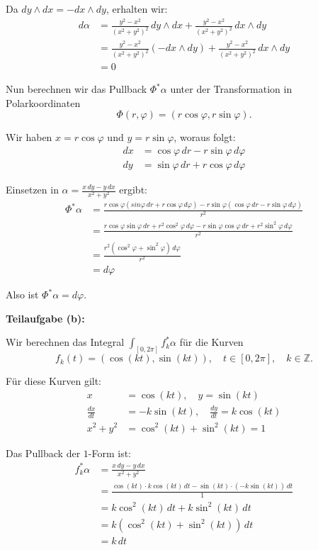 \documentclass{article}
\newcommand{\Z}{\mathbb{Z}}
\begin{document}
Da $dy \wedge dx = -dx \wedge dy$, erhalten wir:
\begin{align}
d\alpha &= \frac{y^2-x^2}{(x^2+y^2)^2}\,dy \wedge dx + \frac{y^2-x^2}{(x^2+y^2)^2}\,dx \wedge dy \\
&= \frac{y^2-x^2}{(x^2+y^2)^2}(-dx \wedge dy) + \frac{y^2-x^2}{(x^2+y^2)^2}\,dx \wedge dy \\
&= 0
\end{align}

Nun berechnen wir das Pullback $\Phi^*\alpha$ unter der Transformation in Polarkoordinaten
$$\Phi(r,\varphi) = (r\cos\varphi, r\sin\varphi).$$

Wir haben $x = r\cos\varphi$ und $y = r\sin\varphi$, woraus folgt:
\begin{align}
dx &= \cos\varphi\,dr - r\sin\varphi\,d\varphi \\
dy &= \sin\varphi\,dr + r\cos\varphi\,d\varphi
\end{align}

Einsetzen in $\alpha = \frac{x\,dy - y\,dx}{x^2+y^2}$ ergibt:
\begin{align}
\Phi^*\alpha &= \frac{r\cos\varphi(sin\varphi\,dr + r\cos\varphi\,d\varphi) - r\sin\varphi(\cos\varphi\,dr - r\sin\varphi\,d\varphi)}{r^2} \\
&= \frac{r\cos\varphi\sin\varphi\,dr + r^2\cos^2\varphi\,d\varphi - r\sin\varphi\cos\varphi\,dr + r^2\sin^2\varphi\,d\varphi}{r^2} \\
&= \frac{r^2(\cos^2\varphi + \sin^2\varphi)\,d\varphi}{r^2} \\
&= d\varphi
\end{align}

Also ist $\Phi^*\alpha = d\varphi$.

\textbf{Teilaufgabe (b):}

Wir berechnen das Integral $\int_{[0,2\pi]} f_k^*\alpha$ für die Kurven
$$f_k(t) = (\cos(kt), \sin(kt)), \quad t \in [0,2\pi], \quad k \in \Z.$$

Für diese Kurven gilt:
\begin{align}
x &= \cos(kt), \quad y = \sin(kt) \\
\frac{dx}{dt} &= -k\sin(kt), \quad \frac{dy}{dt} = k\cos(kt) \\
x^2 + y^2 &= \cos^2(kt) + \sin^2(kt) = 1
\end{align}

Das Pullback der $1$-Form ist:
\begin{align}
f_k^*\alpha &= \frac{x\,dy - y\,dx}{x^2+y^2} \\
&= \frac{\cos(kt) \cdot k\cos(kt)\,dt - \sin(kt) \cdot (-k\sin(kt))\,dt}{1} \\
&= k\cos^2(kt)\,dt + k\sin^2(kt)\,dt \\
&= k(\cos^2(kt) + \sin^2(kt))\,dt \\
&= k\,dt
\end{align}
\end{document}
